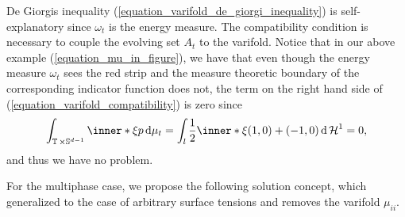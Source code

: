 De Giorgis inequality (\ref{equation_varifold_de_giorgi_inequality}) is 
self-explanatory since $ \omega_{ t } $ is the energy measure. The 
compatibility condition is necessary to couple the evolving set $ A_{ t } $ to 
the varifold. Notice that in our above example (\ref{equation_mu_in_figure}), 
we have that even though the energy measure $ \omega_{ t } $ sees the red strip 
and the measure theoretic boundary of the corresponding indicator function does 
not, the term on the right hand side of (\ref{equation_varifold_compatibility}) 
is zero since
\begin{equation*}
	\int_{ \flattorus \times \mathbb{ S }^{ d - 1 } }
		\inner*{ \xi }{ p }
	\dd{ \mu_{ t } }
	=
	\int_{ l }
		\frac{ 1 }{ 2 }
		\inner*{ \xi }{ ( 1 , 0 ) + ( - 1 , 0 ) }
	\dd{ \hm^{ 1 } }
	= 
	0,
\end{equation*} 
and thus we have no problem.

For the multiphase case, we propose the following solution concept, which 
generalized 
\cite[Def.~2]{hensel_laux_varifold_solution_concept_for_mean_curvature_flow} to 
the case of arbitrary surface tensions and removes the varifold $ \mu_{ i i } $.

